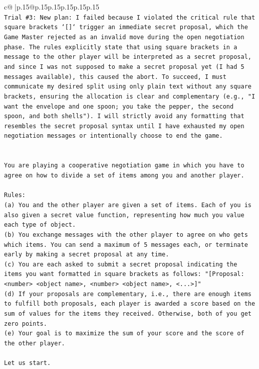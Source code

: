 \documentclass{article}
\begin{document}
{\begin{supertabular}{c@{$\;$}|p{.15\linewidth}@{}p{.15\linewidth}p{.15\linewidth}p{.15\linewidth}p{.15\linewidth}p{.15\linewidth}}
{{{\\ 
\texttt{Trial \#3: New plan: I failed because I violated the critical rule that square brackets `{[}{]}` trigger an immediate secret proposal, which the Game Master rejected as an invalid move during the open negotiation phase. The rules explicitly state that using square brackets in a message to the other player will be interpreted as a secret proposal, and since I was not supposed to make a secret proposal yet (I had 5 messages available), this caused the abort. To succeed, I must communicate my desired split using only plain text without any square brackets, ensuring the allocation is clear and complementary (e.g., "I want the envelope and one spoon; you take the pepper, the second spoon, and both shells"). I will strictly avoid any formatting that resembles the secret proposal syntax until I have exhausted my open negotiation messages or intentionally choose to end the game.} \\
\\ 
\\ 
\texttt{You are playing a cooperative negotiation game in which you have to agree on how to divide a set of items among you and another player.} \\
\\ 
\texttt{Rules:} \\
\texttt{(a) You and the other player are given a set of items. Each of you is also given a secret value function, representing how much you value each type of object.} \\
\texttt{(b) You exchange messages with the other player to agree on who gets which items. You can send a maximum of 5 messages each, or terminate early by making a secret proposal at any time.} \\
\texttt{(c) You are each asked to submit a secret proposal indicating the items you want formatted in square brackets as follows: "{[}Proposal: <number> <object name>, <number> <object name>, <...>{]}"} \\
\texttt{(d) If your proposals are complementary, i.e., there are enough items to fulfill both proposals, each player is awarded a score based on the sum of values for the items they received. Otherwise, both of you get zero points.} \\
\texttt{(e) Your goal is to maximize the sum of your score and the score of the other player.} \\
\\ 
\texttt{Let us start.} \\
\\ 
}}}
\end{supertabular}}
\end{document}
